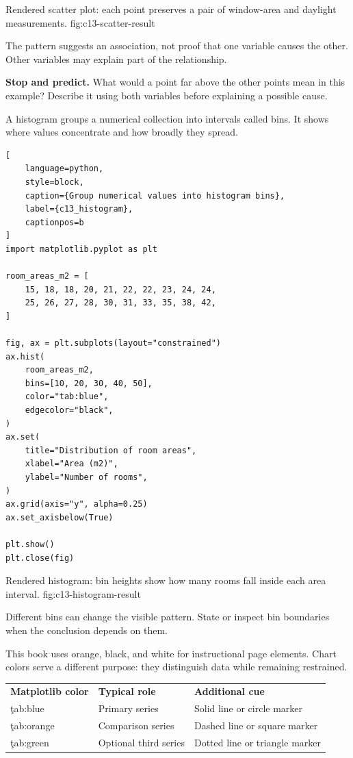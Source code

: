 {Rendered scatter plot: each point preserves a pair of window-area and daylight measurements.}
{fig:c13-scatter-result}

The pattern suggests an association, not proof that one variable causes the
other. Other variables may explain part of the relationship.

\begin{NoteBox}
\textbf{Stop and predict.} What would a point far above the other points mean
in this example? Describe it using both variables before explaining a possible
cause.
\end{NoteBox}


A histogram groups a numerical collection into intervals called bins. It shows
where values concentrate and how broadly they spread.

\begin{lstlisting}[
    language=python,
    style=block,
    caption={Group numerical values into histogram bins},
    label={c13_histogram},
    captionpos=b
]
import matplotlib.pyplot as plt

room_areas_m2 = [
    15, 18, 18, 20, 21, 22, 22, 23, 24, 24,
    25, 26, 27, 28, 30, 31, 33, 35, 38, 42,
]

fig, ax = plt.subplots(layout="constrained")
ax.hist(
    room_areas_m2,
    bins=[10, 20, 30, 40, 50],
    color="tab:blue",
    edgecolor="black",
)
ax.set(
    title="Distribution of room areas",
    xlabel="Area (m2)",
    ylabel="Number of rooms",
)
ax.grid(axis="y", alpha=0.25)
ax.set_axisbelow(True)

plt.show()
plt.close(fig)
\end{lstlisting}

{Rendered histogram: bin heights show how many rooms fall inside each area interval.}
{fig:c13-histogram-result}

Different bins can change the visible pattern. State or inspect bin boundaries
when the conclusion depends on them.


This book uses orange, black, and white for instructional page elements. Chart
colors serve a different purpose: they distinguish data while remaining
restrained.

\begin{center}
\begin{tabular}{lll}
\textbf{Matplotlib color} & \textbf{Typical role} & \textbf{Additional cue} \\
\c{tab:blue} & Primary series & Solid line or circle marker \\
\c{tab:orange} & Comparison series & Dashed line or square marker \\
\c{tab:green} & Optional third series & Dotted line or triangle marker \\
\end{tabular}
\end{center}

